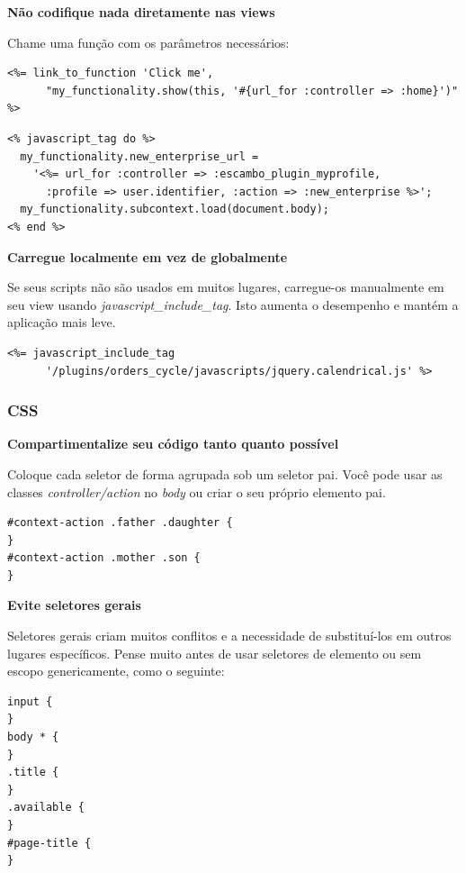\documentclass[11pt]{article}
\begin{document}
{\bf Não codifique nada diretamente nas views}

Chame uma função com os parâmetros necessários:

\begin{Verbatim}[frame=single,fontfamily=courier]
<%= link_to_function 'Click me',
      "my_functionality.show(this, '#{url_for :controller => :home}')" %>
\end{Verbatim}

\begin{Verbatim}[frame=single,fontfamily=courier]
<% javascript_tag do %>
  my_functionality.new_enterprise_url = 
    '<%= url_for :controller => :escambo_plugin_myprofile,
      :profile => user.identifier, :action => :new_enterprise %>';
  my_functionality.subcontext.load(document.body);
<% end %>
\end{Verbatim}

{\bf Carregue localmente em vez de globalmente}

Se seus scripts não são usados em muitos lugares, carregue-os
manualmente em seu view usando {\it javascript\_include\_tag}. Isto aumenta o
desempenho e mantém a aplicação mais leve.

\begin{Verbatim}[frame=single,fontfamily=courier]
<%= javascript_include_tag
      '/plugins/orders_cycle/javascripts/jquery.calendrical.js' %>
\end{Verbatim}

\subsubsection{CSS}

{\bf Compartimentalize seu código tanto quanto possível}

Coloque cada seletor de forma agrupada sob um seletor pai. Você pode usar as
classes {\it controller/action} no {\it body} ou criar o seu próprio elemento pai.

\begin{Verbatim}[frame=single,fontfamily=courier]
#context-action .father .daughter {
}
#context-action .mother .son {
}
\end{Verbatim}

{\bf Evite seletores gerais}

Seletores gerais criam muitos conflitos e a necessidade de substituí-los em
outros lugares específicos. Pense muito antes de usar seletores de elemento ou
sem escopo genericamente, como o seguinte:

\begin{Verbatim}[frame=single,fontfamily=courier]
input {
}
body * {
}
.title {
}
.available {
}
#page-title {
}
\end{Verbatim}
\end{document}
